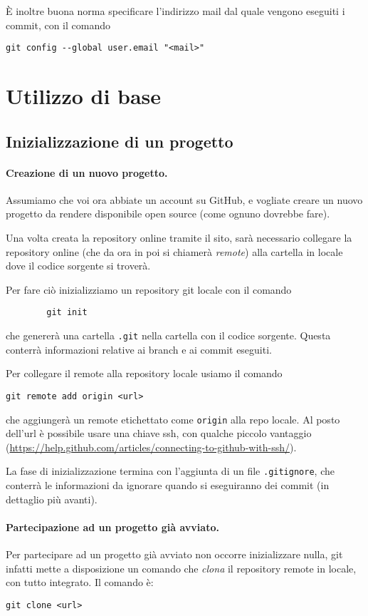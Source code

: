\documentclass[a4paper, 11pt]{article}
\begin{document}
	È inoltre buona norma specificare l'indirizzo mail dal quale vengono eseguiti i commit, con il comando \begin{lstlisting}
git config --global user.email "<mail>"
	\end{lstlisting}
	
	\section{Utilizzo di base}
	\subsection{Inizializzazione di un progetto}
	\paragraph{Creazione di un nuovo progetto.}
	Assumiamo che voi ora abbiate un account su GitHub, e vogliate creare un nuovo progetto da rendere disponibile open source (come ognuno dovrebbe fare).
	
	Una volta creata la repository online tramite il sito, sarà necessario collegare la repository online (che da ora in poi si chiamerà \emph{remote}) alla cartella in locale dove il codice sorgente si troverà. 
	
	Per fare ciò inizializziamo un repository git locale con il comando \begin{lstlisting}
		git init
	\end{lstlisting} che genererà una cartella \lstinline|.git| nella cartella con il codice sorgente. Questa conterrà informazioni relative ai branch e ai commit eseguiti.
	
	Per collegare il remote alla repository locale usiamo il comando \begin{lstlisting}
git remote add origin <url>
	\end{lstlisting}
	che aggiungerà un remote etichettato come \lstinline|origin| alla repo locale. Al posto dell'url è possibile usare una chiave ssh, con qualche piccolo vantaggio (\url{https://help.github.com/articles/connecting-to-github-with-ssh/}).
	
	La fase di inizializzazione termina con l'aggiunta di un file \lstinline|.gitignore|, che conterrà le informazioni da ignorare quando si eseguiranno dei commit (in dettaglio più avanti).
	
	\paragraph{Partecipazione ad un progetto già avviato.}
	Per partecipare ad un progetto già avviato non occorre inizializzare nulla, git infatti mette a disposizione un comando che \emph{clona} il repository remote in locale, con tutto integrato. Il comando è: \begin{lstlisting}
git clone <url>
	\end{lstlisting}
	
\end{document}
